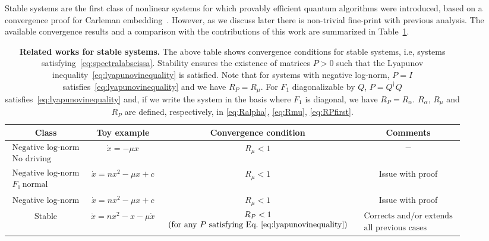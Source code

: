 \documentclass[superscriptaddress,onecolumn,nofootinbib,longbibliography,a4paper,accepted=2026-09-29]{quantumarticle}
\theoremstyle{plain}
\theoremstyle{definition}
\numberwithin{thm}{section}
\numberwithin{assumption}{section}
\numberwithin{lemma}{section}
\numberwithin{prop}{section}
\numberwithin{cor}{section}
\numberwithin{definition}{section}
\numberwithin{rmk}{section}
\numberwithin{equation}{section}
\begin{document}
Stable systems are the first class of nonlinear systems for which provably efficient quantum algorithms were introduced, based on a convergence proof for Carleman embedding~\cite{liu2021efficient}. However, as we discuss later there is non-trivial fine-print with previous analysis.
The available convergence results and a comparison with the contributions of this work are summarized in Table~\ref{tab:stableconvergence}. 
    

\begin{table}
    \begin{adjustbox}{width=\textwidth,center}
    \begin{tabular}{|c|c|c|c|}
        \hline 
        \textbf{Class} & \textbf{Toy example} & \textbf{Convergence condition} & \textbf{Comments} 
        \tabularnewline
        \hline 
        \hline 
        $\begin{array}{c}
       \textrm{Negative log-norm} \\
    \textrm{No driving}
        \end{array}$ & $\dot{x} = - \mu x$ & $R_\mu <1$ \cite{forets2017explicit, costa2023further} & $\begin{array}{c} - \end{array}$
        \tabularnewline
        \hline 
       $\begin{array}{c}
       \textrm{Negative log-norm}\\
    F_1 \, \textrm{normal}
        \end{array}$ & $\dot{x} = nx^2 - \mu x + c $ & $R_\mu <1$ \cite{liu2021efficient} & Issue with proof
        \tabularnewline
        \hline 
       \textrm{Negative log-norm}  & $\dot{x} = nx^2 - \mu x + c $ & $R_\mu <1$ \cite{krovi2023improved} & Issue with proof
        \tabularnewline
        \hline 
        \textrm{Stable}  & $\ddot{x} = nx^2 -x - \mu \dot{x}$ &$\begin{array}{c}
        R_P < 1 \\ \textrm{(for any $P$ satisfying Eq.~\eqref{eq:lyapunovinequality})}
        \end{array}$  & $\begin{array}{c}
        \textrm{Corrects and/or extends}  \\
        \textrm{all previous cases}
        \end{array}$
            \tabularnewline
        \hline
    \end{tabular}
    \end{adjustbox}
    \caption{\textbf{Related works for stable systems.} The above table shows convergence conditions for stable systems, i.e, systems satisfying~\eqref{eq:spectralabscissa}. Stability ensures the existence of matrices $P>0$ such that the Lyapunov inequality~\eqref{eq:lyapunovinequality}  is satisfied. Note that for systems with negative log-norm, $P= I$ satisfies~\eqref{eq:lyapunovinequality}  and we have $R_P = R_\mu$. For $F_1$ diagonalizable by $Q$, $P=Q^\dag Q$ satisfies~\eqref{eq:lyapunovinequality} and, if we write the system in the basis where $F_1$ is diagonal, we have $R_P = R_\alpha$. $R_\alpha$, $R_\mu$ and $R_P$ are defined, respectively, in \eqref{eq:Ralpha}, \eqref{eq:Rmu}, \eqref{eq:RPfirst}.}
    \label{tab:stableconvergence}
\end{table}
\end{document}
